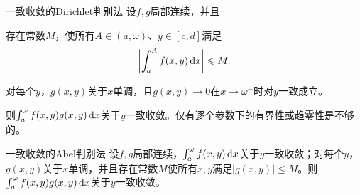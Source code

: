 \begin{theorem}{一致收敛的Dirichlet判别法}{}
    设$f,g$局部连续，并且
    \begin{compactenum}
        \item 存在常数$M$，使所有$A \in (a,\omega)$、$y \in [c,d]$满足
        \[
            \biggl\lvert\int_a^Af(x,y)\mathop{}\!\mathrm{d} x\biggr\rvert \leqslant M.
        \]
        \item 对每个$y$，$g(x,y)$关于$x$单调，且$g(x,y) \to 0$在$x \to \omega^-$时对$y$一致成立。
    \end{compactenum}
    则$\textstyle \int_a^\omega f(x,y)g(x,y)\mathop{}\!\mathrm{d} x$关于$y$一致收敛。仅有逐个参数下的有界性或趋零性是不够的。
\end{theorem}
\begin{theorem}{一致收敛的Abel判别法}{}
    设$f,g$局部连续，$\textstyle \int_a^\omega f(x,y)\mathop{}\!\mathrm{d} x$关于$y$一致收敛；对每个$y$，$g(x,y)$关于$x$单调，并且存在常数$M$使所有$x,y$满足$|g(x,y)| \leq M$。则$\textstyle \int_a^\omega f(x,y)g(x,y)\mathop{}\!\mathrm{d} x$关于$y$一致收敛。
\end{theorem}
